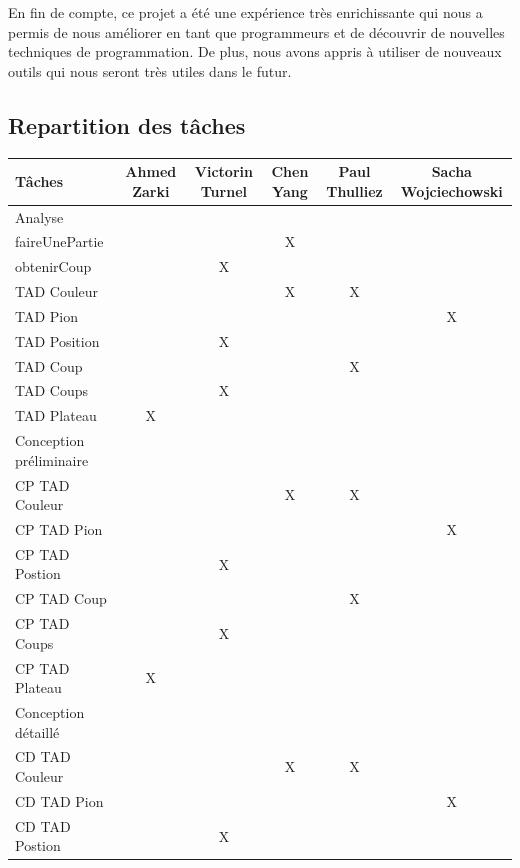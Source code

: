 \documentclass{article}
\begin{document}
\vspace{5mm}

En fin de compte, ce projet a été une expérience très enrichissante qui nous a permis de nous améliorer en tant que programmeurs et de découvrir de nouvelles techniques de programmation. De plus, nous avons appris à utiliser de nouveaux outils qui nous seront très utiles dans le futur.

\subsection{Repartition des tâches}
\begin{tabular}{|l|c|c|c|c|c|}
  \hline
  Tâches & Ahmed Zarki & Victorin Turnel & Chen Yang & Paul Thulliez & Sacha Wojciechowski \\
  \hline
  Analyse \\
  \hline
  faireUnePartie & & & X & & \\
  obtenirCoup & & X & & & \\
  TAD Couleur  & & & X & X & \\
  TAD Pion & & & & & X \\
  TAD Position & & X & & & \\
  TAD Coup & & & & X & \\
  TAD Coups & & X  & & &  \\
  TAD Plateau & X & & & & \\
  \hline
  Conception préliminaire \\
  \hline
  CP TAD Couleur & & & X & X & \\
  CP TAD Pion & & & & & X \\
  CP TAD Postion & & X & & & \\
  CP TAD Coup & & & & X & \\              
  CP TAD Coups & & X & & & \\             
  CP TAD Plateau & X & & & & \\
  \hline
  Conception détaillé \\
  \hline
  CD TAD Couleur & & & X & X & \\                                                                                                                                                                       
  CD TAD Pion & & & & & X \\                                                                                   
  CD TAD Postion & & X & & &  \\                                                                                                                                                                         

\end{tabular}
\end{document}
